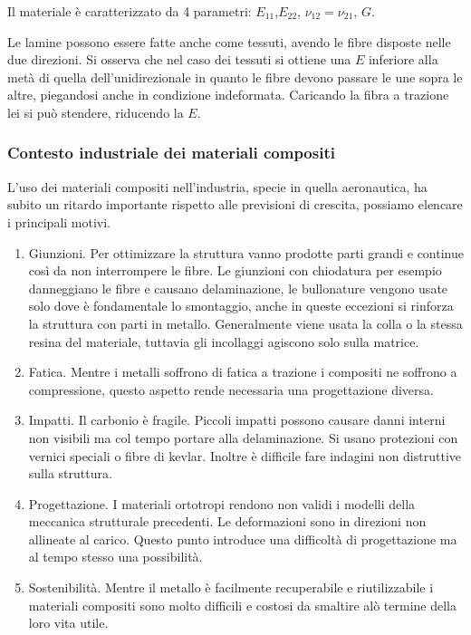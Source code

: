 Il materiale è caratterizzato da 4 parametri:  $E_{11}$,$E_{22}$,  $\nu_{12}=\nu_{21}$,  $G$.

Le lamine possono essere fatte anche come tessuti, avendo le fibre disposte nelle due direzioni. Si osserva che nel caso dei tessuti si ottiene una $E$ inferiore alla metà di quella dell'unidirezionale in quanto le fibre devono passare le une sopra le altre, piegandosi anche in condizione indeformata. Caricando la fibra a trazione lei si può stendere, riducendo la $E$.

\subsubsection*{Contesto industriale dei materiali compositi}
L'uso dei materiali compositi nell'industria, specie in quella aeronautica, ha subito un ritardo importante rispetto alle previsioni di crescita, possiamo elencare i principali motivi.

\begin{enumerate}
    \item Giunzioni. Per ottimizzare la struttura vanno prodotte parti grandi e continue così da non interrompere le fibre. Le giunzioni con chiodatura per esempio danneggiano le fibre e causano delaminazione, le bullonature vengono usate solo dove è fondamentale lo smontaggio, anche in queste eccezioni si rinforza la struttura con parti in metallo. Generalmente viene usata la colla o la stessa resina del materiale, tuttavia gli incollaggi agiscono solo sulla matrice.\\
    \item Fatica. Mentre i metalli soffrono di fatica a trazione i compositi ne soffrono a compressione, questo aspetto rende necessaria una progettazione diversa.\\
    \item Impatti. Il carbonio è fragile. Piccoli impatti possono causare danni interni non visibili ma col tempo portare alla delaminazione. Si usano protezioni con vernici speciali o fibre di kevlar. Inoltre è difficile fare indagini non distruttive sulla struttura.\\
    \item Progettazione. I materiali ortotropi rendono non validi i modelli della meccanica strutturale precedenti. Le deformazioni sono in direzioni non allineate al carico. Questo punto introduce una difficoltà di progettazione ma al tempo stesso una possibilità.\\
    \item Sostenibilità. Mentre il metallo è facilmente recuperabile e riutilizzabile i materiali compositi sono molto difficili e costosi da smaltire alò termine della loro vita utile.
\end{enumerate}

